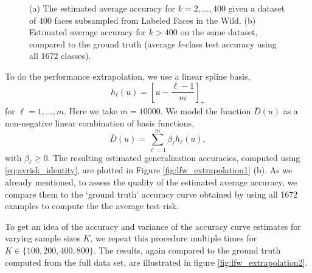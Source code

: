 \documentclass[12pt]{article}
\begin{document}
\begin{figure}
\begin{tabular}{cc}
\end{tabular}
\caption{(a) The estimated average accuracy for $k = 2,\hdots,
  400$ given a dataset of 400 faces subsampled from Labeled Faces in
  the Wild.  (b) Estimated average accuracy for $k > 400$ on the
  same dataset, compared to the ground truth (average $k$-class test accuracy
  using all 1672 classes).}
\label{fig:lfw_extrapolation1}
\end{figure}

To do the performance extrapolation, we use a linear
spline basis,
\[
h_\ell(u) = \left[u - \frac{\ell - 1}{m}\right]_+
\]
for $\ell = 1,\hdots, m$.  Here we take $m = 10000$.  We model the
function $\bar{D}(u)$ as a non-negative linear combination of basis
functions,
\[
\bar{D}(u) = \sum_{\ell = 1}^m \beta_\ell h_\ell(u),
\]
with $\beta_\ell \geq 0$.  The resulting estimated generalization
accuracies, computed using \eqref{eq:avrisk_identity}, are plotted in
Figure \eqref{fig:lfw_extrapolation1} (b).  As we already mentioned, to
assess the quality of the estimated average accuracy, we compare them
to the `ground truth' accuracy curve obtained by using all 1672
examples to compute the the average test risk.



To get an idea of the accuracy and variance of the accuracy curve
estimates for varying sample sizes $K$, we repeat this procedure
multiple times for $K \in \{100,200,400, 800\}$.  The results, again
compared to the ground truth computed from the full data set, are
illustrated in figure \ref{fig:lfw_extrapolation2}.
\end{document}
